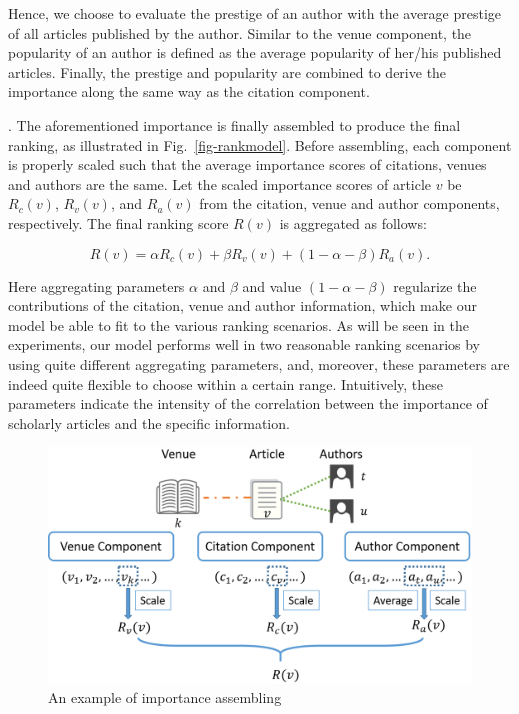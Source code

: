 Hence, we choose to evaluate the prestige of an author with the average prestige of all articles published by the author. Similar to the venue component, the popularity of an author is  defined as the average popularity of her/his published articles. Finally, the prestige and popularity are combined to derive the importance along the same way as the citation component.


. The aforementioned importance is finally assembled to produce the final ranking, as illustrated in Fig.~\ref{fig-rankmodel}. Before assembling, each component is properly scaled such that the average importance scores of citations, venues and authors are the same.  Let the scaled importance scores of article $v$ be $R_c(v)$, $R_v(v)$, and $R_a(v)$ from the citation, venue and author components, respectively.
%
The final ranking score $R(v)$ is aggregated as follows:

\vspace{-1ex}
\begin{small}
\begin{equation} \label{eq-ensemble-app}
R(v) =  \alpha R_c(v) + \beta R_v(v) + (1 - \alpha - \beta) R_a(v).
\end{equation}
\end{small}
\noindent Here aggregating parameters $\alpha$ and $\beta$ and value $(1 - \alpha - \beta)$ regularize the contributions of the citation, venue and author information,
which make our model be able to fit to the various ranking scenarios. As will be seen in the experiments, our model performs well in two reasonable ranking scenarios by using quite different aggregating parameters, and, moreover, these parameters are indeed quite flexible to choose within a certain range.
Intuitively, these parameters indicate the intensity of the correlation between the importance of scholarly articles and the specific information.



\begin{figure}[tb!]
\centering
\includegraphics[scale=0.37]{fig/example-ranking.eps}
\vspace{-2ex}
\caption{\small An example of importance assembling} \label{fig-example-ranking}
\vspace{-3ex}
\end{figure}

